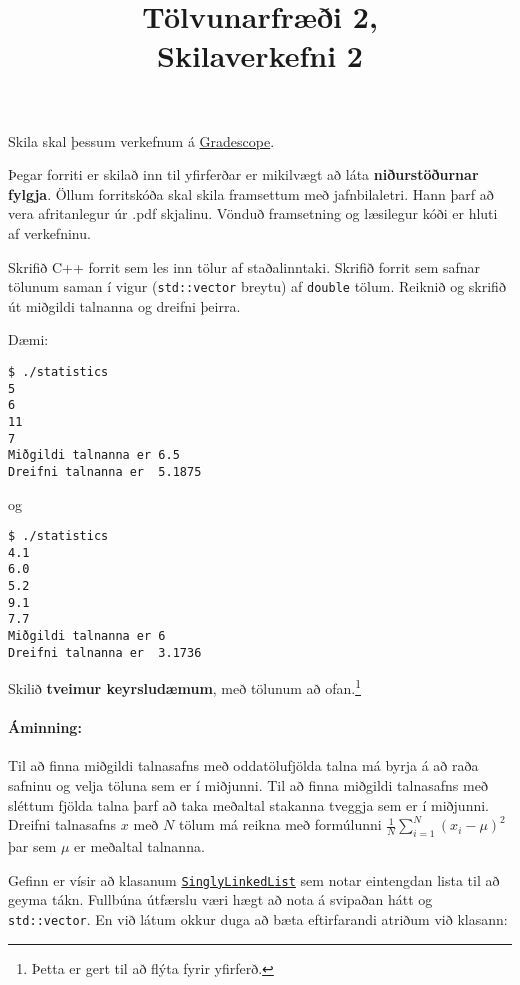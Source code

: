\documentclass{article}
\title{Tölvunarfræði 2, \semester \\ Skilaverkefni 2}
\author{}
\begin{document}
\maketitle
{}

Skila skal þessum verkefnum á \href{https://gradescope.com/courses/14122}{Gradescope}.

Þegar forriti er skilað inn til yfirferðar er mikilvægt að láta \textbf{niðurstöðurnar fylgja}. Öllum forritskóða skal skila framsettum með jafnbilaletri. Hann þarf að vera afritanlegur úr .pdf skjalinu. Vönduð framsetning og læsilegur kóði er hluti af verkefninu.

\question

Skrifið C++ forrit sem les inn tölur af staðalinntaki. Skrifið forrit sem safnar tölunum saman í vigur (\texttt{std::vector} breytu) af \texttt{double} tölum. Reiknið og skrifið út miðgildi  talnanna og dreifni  þeirra.

Dæmi:
\begin{verbatim}
$ ./statistics
5
6
11
7
Miðgildi talnanna er 6.5
Dreifni talnanna er  5.1875
\end{verbatim}
og 
\begin{verbatim}
$ ./statistics
4.1
6.0
5.2
9.1
7.7
Miðgildi talnanna er 6
Dreifni talnanna er  3.1736
\end{verbatim}

Skilið \textbf{tveimur keyrsludæmum}, með tölunum að ofan.\footnote{Þetta er gert til að flýta fyrir yfirferð.} 

\paragraph{Áminning:} Til að finna miðgildi talnasafns með oddatölufjölda talna má byrja á að raða safninu og velja töluna sem er í miðjunni. Til að finna miðgildi talnasafns með sléttum fjölda talna þarf að taka meðaltal stakanna tveggja sem er í miðjunni. Dreifni talnasafns $x$ með $N$ tölum má reikna með formúlunni $\frac{1}{N} \sum_{i=1}^N(x_i - \mu)^2$ þar sem $\mu$ er meðaltal talnanna.

\newpage

\question

Gefinn er vísir að klasanum \href{https://raw.githubusercontent.com/Ernir/kennsluefni/master/T2/Code/w3/singlylinkedlist.cpp}{\texttt{SinglyLinkedList}} sem notar eintengdan lista til að geyma tákn. Fullbúna útfærslu væri hægt að nota á svipaðan hátt og \texttt{std::vector}. En við látum okkur duga að bæta eftirfarandi atriðum við klasann:
\end{document}

